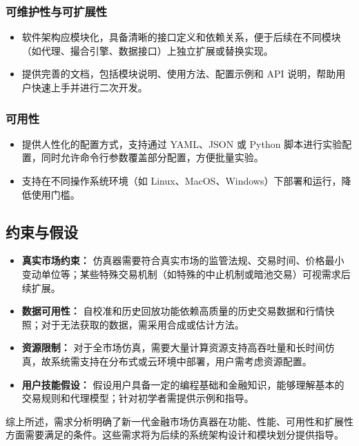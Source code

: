 \subsubsection{可维护性与可扩展性}

\begin{itemize}
  \item 软件架构应模块化，具备清晰的接口定义和依赖关系，便于后续在不同模块（如代理、撮合引擎、数据接口）上独立扩展或替换实现。
  \item 提供完善的文档，包括模块说明、使用方法、配置示例和 API 说明，帮助用户快速上手并进行二次开发。
\end{itemize}

\subsubsection{可用性}

\begin{itemize}
  \item 提供人性化的配置方式，支持通过 YAML、JSON 或 Python 脚本进行实验配置，同时允许命令行参数覆盖部分配置，方便批量实验。
  \item 支持在不同操作系统环境（如 Linux、MacOS、Windows）下部署和运行，降低使用门槛。
\end{itemize}

\subsection{约束与假设}

\begin{itemize}
  \item \textbf{真实市场约束：} 仿真器需要符合真实市场的监管法规、交易时间、价格最小变动单位等；某些特殊交易机制（如特殊的中止机制或暗池交易）可视需求后续扩展。
  \item \textbf{数据可用性：} 自校准和历史回放功能依赖高质量的历史交易数据和行情快照；对于无法获取的数据，需采用合成或估计方法。
  \item \textbf{资源限制：} 对于全市场仿真，需要大量计算资源支持高吞吐量和长时间仿真，故系统需支持在分布式或云环境中部署，用户需考虑资源配置。
  \item \textbf{用户技能假设：} 假设用户具备一定的编程基础和金融知识，能够理解基本的交易规则和代理模型；针对初学者需提供示例和指导。
\end{itemize}

综上所述，需求分析明确了新一代金融市场仿真器在功能、性能、可用性和扩展性方面需要满足的条件。这些需求将为后续的系统架构设计和模块划分提供指导。